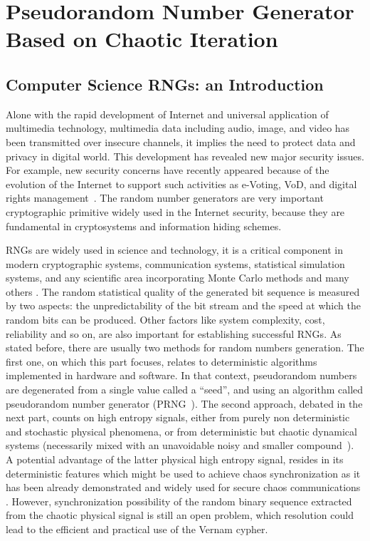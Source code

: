 \part{Pseudorandom Number Generator Based on Chaotic Iteration}
\label{Pseudo Random Number Generator Based on Chaotic Iteration}
\chapter{Computer Science RNGs: an Introduction}
\label{Introduction}
\minitoc
Alone with the rapid development of Internet and universal application of multimedia technology, multimedia data including audio, image, and video has been transmitted over insecure channels, it implies the need to protect data and privacy in digital world. This development has revealed new major security issues. For example, new security concerns have recently appeared because of the evolution of the Internet to support such activities as e-Voting, VoD, and digital rights management~\cite{Zhu200675}. The random number generators  are very important cryptographic primitive widely used in the Internet security, because they are fundamental in cryptosystems and information hiding schemes. 

RNGs are widely used in science and technology, it is a critical component in modern cryptographic systems, communication systems, statistical simulation systems, and any scientific area incorporating Monte Carlo methods and many others \cite{quantum,communication,cryptography}. The random statistical quality of the generated bit sequence is measured by two aspects: the unpredictability of the bit stream and the speed at which the random bits can be produced.  Other factors like system complexity, cost, reliability and so on, are also important for establishing successful RNGs. As stated before, there are usually two methods for random numbers generation. The first one, on which this part focuses, relates to deterministic algorithms implemented in hardware and software. In that context, pseudorandom numbers are degenerated from a single value called a ``seed'', and using an algorithm called pseudorandom number generator (PRNG~\cite{LEcuyer08}). The second approach, debated in the next part, counts on high entropy signals, either from purely non deterministic and stochastic physical phenomena, or from deterministic but chaotic dynamical systems (necessarily mixed with an unavoidable noisy and smaller compound~\cite{fast,dice}). A potential advantage of the latter physical high entropy signal, resides in its deterministic features which might be used to achieve chaos synchronization as it has been already demonstrated \cite{pecora:prl90} and widely used for secure chaos communications \cite{argyris:nat05}. However, synchronization possibility of the random binary sequence extracted from the chaotic physical signal is still an open problem, which resolution could lead to the efficient and practical use of the Vernam cypher.

